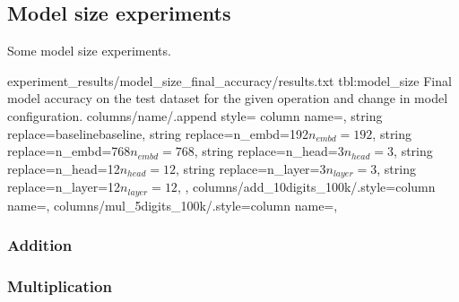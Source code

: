 \subsection{Model size experiments}

Some model size experiments.

{experiment_results/model_size_final_accuracy/results.txt}
{tbl:model_size}
{Final model accuracy on the test dataset for the given operation and change in model configuration.}
{%
    columns/name/.append style={
        column name={},
        string replace={baseline}{baseline},
        string replace={n_embd=192}{$n_{embd}=192$},
        string replace={n_embd=768}{$n_{embd}=768$},
        string replace={n_head=3}{$n_{head}=3$},
        string replace={n_head=12}{$n_{head}=12$},
        string replace={n_layer=3}{$n_{layer}=3$},
        string replace={n_layer=12}{$n_{layer}=12$},
    },
    columns/add_10digits_100k/.style={column name={}},
    columns/mul_5digits_100k/.style={column name={}},
}



\subsubsection{Addition}

\subsubsection{Multiplication}